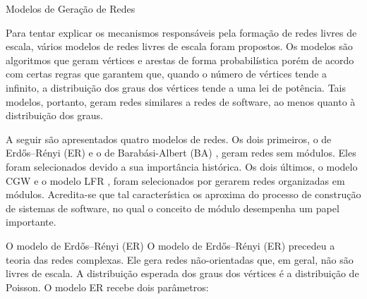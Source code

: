 \begin{section}{Modelos de Geração de Redes}

Para tentar explicar os mecanismos responsáveis pela formação de redes livres de escala, vários modelos de redes livres de escala foram propostos. Os modelos são algoritmos que geram vértices e arestas de forma probabilística porém de acordo com certas regras que garantem que, quando o número de vértices tende a infinito, a distribuição dos graus dos vértices tende a uma lei de potência. Tais modelos, portanto, geram redes similares a redes de software, ao menos quanto à distribuição dos graus.

A seguir são apresentados quatro modelos de redes. Os dois primeiros, o de Erdős–Rényi (ER) \cite{Erdos1959} e o de Barabási-Albert (BA) \cite{Barabasi1999}, geram redes sem módulos. Eles foram selecionados devido a sua importância histórica. Os dois últimos, o modelo CGW \cite{Chen2008} e o modelo LFR \cite{Lancichinetti2008,Lancichinetti2009}, foram selecionados por gerarem redes organizadas em módulos. Acredita-se que tal característica os aproxima do processo de construção de sistemas de software, no qual o conceito de módulo desempenha um papel importante.



% 

 

\begin{subsection}{O modelo de Erdős–Rényi (ER)}
	O modelo de Erdős–Rényi (ER) \cite{Erdos1959} precedeu a teoria das redes complexas. Ele gera redes não-orientadas que, em geral, não são livres de escala. A distribuição esperada dos graus dos vértices é a distribuição de Poisson. O modelo ER recebe dois parâmetros:
	

\end{subsection}
\end{section}
